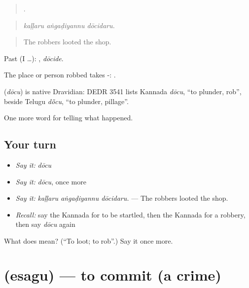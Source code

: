 \begin{quote}
  .
\end{quote}

\begin{quote}
\emph{kaḷḷaru aṅgaḍiyannu dōcidaru.}
\end{quote}

\begin{quote}
The robbers looted the shop.
\end{quote}

Past (I …): , \emph{dōcide}.

The place or person robbed takes -:  .

\begin{cousinweb}
\textbf{} (\emph{dōcu}) is native Dravidian: DEDR 3541 lists Kannada \emph{dōcu}, \textquotedblleft{}to plunder, rob\textquotedblright{}, beside Telugu \emph{dō̃cu}, \textquotedblleft{}to plunder, pillage\textquotedblright{}.
\end{cousinweb}

\begin{grammarlens}[title={What you've built}]
One more word for telling what happened.
\end{grammarlens}

\subsection*{Your turn}
\begin{itemize}
\raggedright
  \item \emph{Say it:} \emph{dōcu}
  \item \emph{Say it:} \emph{dōcu}, once more
  \item \emph{Say it:} \emph{kaḷḷaru aṅgaḍiyannu dōcidaru.} — The robbers looted the shop.
  \item \emph{Recall:} say the Kannada for to be startled, then the Kannada for a robbery, then say \emph{dōcu} again
\end{itemize}

\begin{tcolorbox}[breakable,colback=teal!4,colframe=teal!35!black,title={Before you move on}]
What does  mean? (\textquotedblleft{}To loot; to rob\textquotedblright{}.) Say it once more.
\end{tcolorbox}
\section[\texorpdfstring{\kn{ಎಸಗು} (esagu)}{ಎಸಗು (esagu)}]{ (esagu) — to commit (a crime)}

